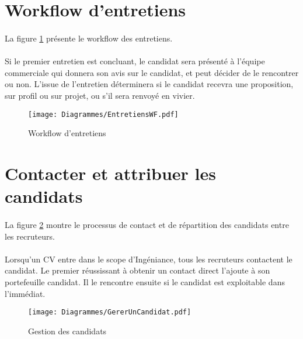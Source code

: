 \section{Workflow d'entretiens}
\label{sec:entretiens}

\paragraph{} La figure \ref{entretiens} présente le workflow des entretiens.
 
\paragraph{} Si le premier entretien est concluant, le candidat sera présenté à l'équipe commerciale qui donnera son avis sur le candidat, et peut décider de le rencontrer ou non. L'issue de l'entretien déterminera si le candidat recevra une proposition, sur profil ou sur projet, ou s'il sera renvoyé en vivier.

\begin{figure}
	\centering
	\texttt{[image: Diagrammes/EntretiensWF.pdf]}
	\caption{Workflow d'entretiens}
	\label{entretiens}	
\end{figure}

\section{Contacter et attribuer les candidats}
\label{section:portefeuille}
\paragraph{} La figure \ref{gestionCandidats} montre le processus de contact et de répartition des candidats entre les recruteurs.
\paragraph{} Lorsqu'un CV entre dans le scope d'Ingéniance, tous les recruteurs contactent le candidat. Le premier réussissant à obtenir un contact direct l'ajoute à son portefeuille candidat. Il le rencontre ensuite si le candidat est exploitable dans l'immédiat. 
\begin{figure}
	\centering
	\texttt{[image: Diagrammes/GererUnCandidat.pdf]}
	\caption{Gestion des candidats}
	\label{gestionCandidats}	
\end{figure}

